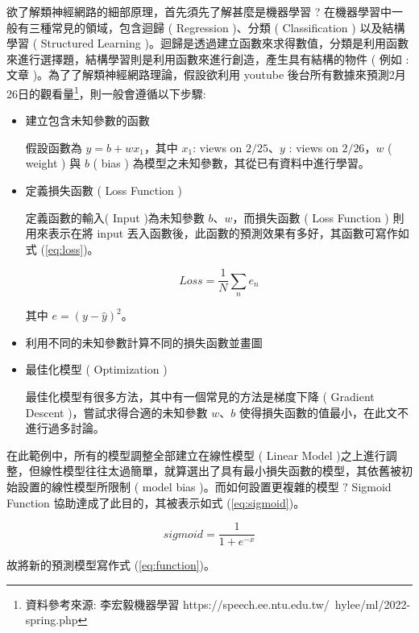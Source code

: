 欲了解類神經網路的細部原理，首先須先了解甚麼是機器學習 ? 在機器學習中一般有三種常見的領域，包含迴歸 ( Regression )、分類 ( Classification ) 以及結構學習 ( Structured Learning )。迴歸是透過建立函數來求得數值，分類是利用函數來進行選擇題，結構學習則是利用函數來進行創造，產生具有結構的物件 ( 例如 : 文章 )。為了了解類神經網路理論，假設欲利用 youtube 後台所有數據來預測2月26日的觀看量\footnote{資料參考來源: 李宏毅機器學習 https://speech.ee.ntu.edu.tw/~hylee/ml/2022-spring.php}，則一般會遵循以下步驟:

\begin{itemize}
\item{} 建立包含未知參數的函數

假設函數為 $y=b+w x_1$，其中 $x_1$: views on $2/25$、$y$ : views on $2/26$，$w$ ( weight ) 與 $b$ ( bias ) 為模型之未知參數，其從已有資料中進行學習。

\item{} 定義損失函數 ( Loss Function )

定義函數的輸入( Input )為未知參數 $b$、$w$，而損失函數 ( Loss Function ) 則用來表示在將 input 丟入函數後，此函數的預測效果有多好，其函數可寫作如式 (\ref{eq:loss})。

\begin{equation}\label{eq:loss}
Loss = \frac{1}{N}\sum_{n}e_n
\end{equation}

其中 $e=(y-\hat{y})^{2}$。

\item{} 利用不同的未知參數計算不同的損失函數並畫圖

\item{} 最佳化模型 ( Optimization )

最佳化模型有很多方法，其中有一個常見的方法是梯度下降 ( Gradient Descent )，嘗試求得合適的未知參數 $w$、$b$ 使得損失函數的值最小，在此文不進行過多討論。

\end{itemize}

在此範例中，所有的模型調整全部建立在線性模型 ( Linear Model )之上進行調整，但線性模型往往太過簡單，就算選出了具有最小損失函數的模型，其依舊被初始設置的線性模型所限制 ( model bias )。而如何設置更複雜的模型 $?$ Sigmoid Function 協助達成了此目的，其被表示如式 (\ref{eq:sigmoid})。

\begin{equation}\label{eq:sigmoid}
sigmoid = \frac{1}{1+e^{-x}}
\end{equation}

故將新的預測模型寫作式 (\ref{eq:function})。

